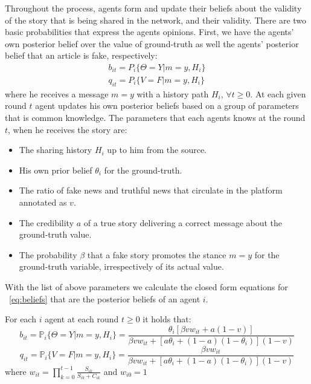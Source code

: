 Throughout the process, agents form and update their beliefs about the validity of the story that is being shared in the network, and their validity. There are two basic probabilities that express the agents opinions. First, we have the agents' own posterior belief over the value of ground-truth as well the agents' posterior belief that an article is fake, respectively: 
\begin{equation}\label{eq:beliefs}
	\begin{split}
		b_{it} = P_i \{ \Theta = Y | m = y , H_i \} \\
		q_{it} = P_i \{ V=F | m = y , H_i \}
	\end{split}
\end{equation}
where he receives a message $m=y$ with a history path $H_i$, $\forall t \geq 0$. At each given round $t$ agent updates his own posterior beliefs based on a group of parameters that is common knowledge. The parameters that each agents knows at the round $t$, when he receives the story are:

\begin{itemize}
	\item The sharing history $H_i$ up to him from the source.
	\item His own prior belief $\theta_i$ for the ground-truth.
	\item The ratio of fake news and truthful news that circulate in the platform annotated as $v$.
	\item The credibility $a$ of a true story delivering a correct message about the ground-truth value. 
	\item The probability $\beta$ that a fake story promotes the stance $m=y$ for the  ground-truth variable, irrespectively of its actual value.   
\end{itemize}
With the list of above parameters we calculate the closed form equations for ~\ref{eq:beliefs} that are the posterior beliefs of an agent $i$.
\begin{prop}
	For each $i$ agent at each round $t \geq 0$ it holds that:
	$$b_{it} = \mathbb{P}_i \{ \Theta = Y | m = y , H_i \} =  \frac{\theta_i[\beta v w_{it}+a(1-v)]}{\beta v w_{it} + [a \theta_i + (1-a)(1-\theta_i)](1-v)}$$
	$$q_{it} = \mathbb{P}_i \{ V=F | m = y , H_i \} = \frac{\beta v w_{it}}{\beta v w_{it} + [a \theta_i + (1-a)(1-\theta_i)](1-v)}$$
where $w_{it} = \displaystyle\prod_{k=0}^{t-1} \frac{S_{ik}}{S_{ik}+C_{ik}}$ and $w_{i0} = 1$
\label{prop:beliefs}
\end{prop}

